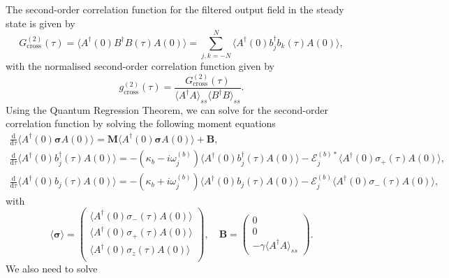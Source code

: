 \documentclass{article}
\newcommand{\ddtau}{\frac{\mathrm{d}}{\mathrm{d}\tau}}
\begin{document}
The second-order correlation function for the filtered output field in the steady state is given by
\begin{equation}
	G^{(2)}_{\mathrm{cross}}(\tau) = \langle A^{\dagger}(0) B^{\dagger} B(\tau) A(0) \rangle = \sum_{j,k=-N}^{N} \langle A^{\dagger}(0) b^{\dagger}_{j} b_{k} (\tau) A(0) \rangle,
\end{equation}
with the normalised second-order correlation function given by
\begin{equation}
	g^{(2)}_{\mathrm{cross}}(\tau) = \frac{G^{(2)}_{\mathrm{cross}}(\tau)}{\langle A^{\dagger} A \rangle_{ss} \langle B^{\dagger} B \rangle_{ss}}.
\end{equation}
Using the Quantum Regression Theorem, we can solve for the second-order correlation function by solving the following moment equations
\begin{subequations}
	\begin{gather}
		\ddtau \langle A^{\dagger}(0) \bm{\sigma} A(0) \rangle = \bm{M} \langle A^{\dagger}(0) \bm{\sigma} A(0) \rangle + \bm{B}, \\
		\ddtau \langle A^{\dagger}(0) b^{\dagger}_{j}(\tau) A(0) \rangle = -\left( \kappa_{b} - i \omega_{j}^{(b)} \right) \langle A^{\dagger}(0) b^{\dagger}_{j}(\tau) A(0) \rangle - \mathcal{E}_{j}^{(b) *} \langle A^{\dagger}(0) \sigma_{+}(\tau) A(0) \rangle, \\
		\ddtau \langle A^{\dagger}(0) b_{j}(\tau) A(0) \rangle = -\left( \kappa_{b} + i \omega_{j}^{(b)} \right) \langle A^{\dagger}(0) b_{j}(\tau) A(0) \rangle - \mathcal{E}_{j}^{(b)} \langle A^{\dagger}(0) \sigma_{-}(\tau) A(0) \rangle,
	\end{gather}
\end{subequations}
with
\begin{equation}
	\langle \bm{\sigma} \rangle = 
	\begin{pmatrix}
		\langle A^{\dagger}(0) \sigma_{-}(\tau) A(0) \rangle \\
		\langle A^{\dagger}(0) \sigma_{+}(\tau) A(0) \rangle \\
		\langle A^{\dagger}(0) \sigma_{z}(\tau) A(0) \rangle \\
	\end{pmatrix}, \quad \bm{B} = 
	\begin{pmatrix}
		0 \\
		0 \\
		-\gamma \langle A^{\dagger} A \rangle_{ss}
	\end{pmatrix}.
\end{equation}
We also need to solve
\end{document}
